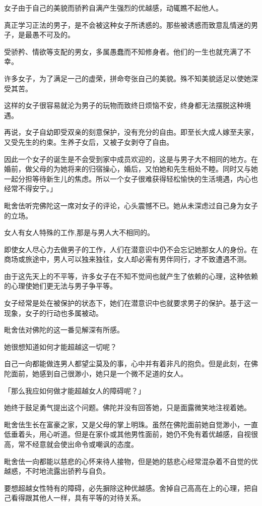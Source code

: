 \documentclass[twoside,openany]{book}
\begin{document}
女子由于自己的美貌而骄矜自满产生强烈的优越感，动辄瞧不起他人。

真正学习正法的男子，是不会被这种女子所诱惑的。那些被诱惑而致意乱情迷的男子，是最愚不可及的。

受骄矜、情欲等支配的男女，多属愚蠢而不知修身者。他们的一生也就充满了不幸。

许多女子，为了满足一己的虚荣，拼命夸张自己的美貌。殊不知美貌适足以使她深受其苦。

这样的女子很容易就沦为男子的玩物而致终日烦恼不安，终身都无法摆脱这种境遇。

再说，女子自幼即受双亲的刻意保护，没有充分的自由。即至长大成人嫁至夫家，又受先生的约束。生养子女后，又被子女剥夺了自由。

因此一个女子的诞生是不会受到家中成员欢迎的，这是与男子大不相同的地方。在婚前，做父母的为她将来的归宿操心，婚后，又怕她和先生相处不睦。同时又与她一起分担等待新生儿的焦虑。所以一个女子很难获得轻松愉快的生活境遇，内心也经常不得安宁。」

毗舍佉听完佛陀这一席对女子的评论，心头震憾不已。她从未深虑过自己身为女子的立场。

女人有女人特殊的工作,那是与男人大不相同的。

即使女人尽心力去做男子的工作，人们在潜意识中仍不会忘记她那女人的身份。在商场或旅途中，男人可以独来独往，女人却必需有男伴同行，才不致遭遇不测。

由于这先天上的不平等，许多女子在不知不觉间也就产生了依赖的心理，这种依赖的心理使她们更无法与男子争平等。

女子经常是处在被保护的状态下，她们在潜意识中也就要求男子的保护。基于这一现象，女子的行动也多属被动。

毗舍佉对佛陀的这一番见解深有所感。

她很想知道如何才能超越这一切呢？

自己一向都能做连男人都望尘莫及的事，心中并有着非凡的抱负。但是此刻，在佛陀面前，她感到自己很渺小，她只是一个微不足道的女人。

「那么我应如何做才能超越女人的障碍呢？」

她终于鼓足勇气提出这个问题。佛陀并没有回答她，只是面露微笑地注视着她。

毗舍佉生长在富豪之家，又是父母的掌上明珠。虽然在佛陀面前她自觉渺小，一直低垂着头，用心听道。但是在家仆或其他男性面前，她仍不免有着优越感，自视很高，常不经意就会使出命令或嘲讽的态度。

毗舍佉一向都能以慈悲的心怀来待人接物，但是她的慈悲心经常混杂着不自觉的优越惑，不时地流露出骄矜与自负。

要想超越女性特有的障碍，必先摒除这种优越感。舍掉自己高高在上的心理，把自己看得跟其他人一样，具有平等的对待关系。
\end{document}
